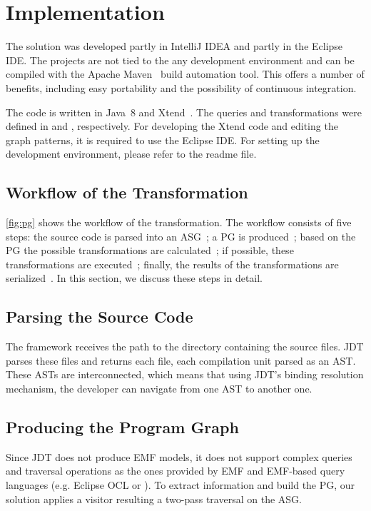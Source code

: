 \documentclass[submission,copyright,creativecommons]{eptcs}
\begin{document}
\section{Implementation}

The solution was developed partly in IntelliJ IDEA and partly in the Eclipse IDE. The projects are not tied to the any development environment and can be compiled with the Apache Maven~\cite{Maven} build automation tool. This offers a number of benefits, including easy portability and the possibility of continuous integration.

The code is written in Java~8 and Xtend~\cite{Xtend}. The queries and transformations were defined in \eiq and \viatra, respectively. For developing the Xtend code and editing the graph patterns, it is required to use the Eclipse IDE. For setting up the development environment, please refer to the readme file. 

\subsection{Workflow of the Transformation}


\noindent\autoref{fig:pg} shows the workflow of the transformation. The workflow consists of five steps: the source code is parsed into an ASG~; a PG is produced~; based on the PG the possible transformations are calculated~; if possible, these transformations are executed~; finally, the results of the transformations are serialized~. In this section, we discuss these steps in detail.

\subsection[Parsing the Source Code]{Parsing the Source Code\qquad{}}
The framework receives the path to the directory containing the source files. JDT parses these files and returns each file, each compilation unit parsed as an AST. These ASTs are interconnected, which means that using JDT's binding resolution mechanism, the developer can navigate from one AST to another one.

\subsection[Producing the Program Graph]{Producing the Program Graph\qquad{}}
Since JDT does not produce EMF models, it does not support complex queries and traversal operations as the ones provided by EMF and EMF-based query languages (e.g. Eclipse OCL or \eiq). To extract information and build the PG, our solution applies a visitor resulting a two-pass traversal on the ASG.
\end{document}
